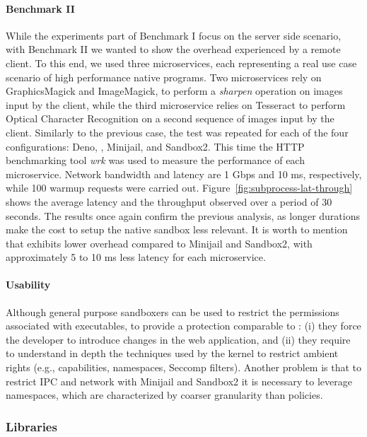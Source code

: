 \paragraph{Benchmark II}
%
While the experiments part of Benchmark I focus on the server side
scenario, with Benchmark II we wanted to show the overhead experienced
by a remote client. To this end, we used three microservices,
each representing a real use case scenario of high performance native
programs. Two microservices rely on GraphicsMagick and ImageMagick, to
perform a {\em sharpen} operation on images input by the client, while
the third microservice relies on Tesseract to perform Optical
Character Recognition on a second sequence of images input by the
client. Similarly to the previous case, the test was repeated for each
of the four configurations: Deno, \natisand, Minijail, and Sandbox2. This
time the HTTP benchmarking tool {\em wrk} was used to measure the
performance of each microservice.  Network bandwidth and latency are 1
Gbps and 10 ms, respectively, while 100 warmup requests were carried
out. Figure~\ref{fig:subprocess-lat-through} shows the average latency
and the throughput observed over a period of 30 seconds. The results
once again confirm the previous analysis, as longer durations make the
cost to setup the native sandbox less relevant. It is worth to mention
that \natisand exhibits lower overhead compared to Minijail and Sandbox2,
with approximately 5 to 10 ms less latency for each microservice.


\paragraph{Usability}
%
Although general purpose sandboxers can be used to restrict the
permissions associated with executables, to provide a protection
comparable to \natisand: (i) they force the developer to introduce changes in
the web application, and (ii) they require to understand in depth the
techniques used by the kernel to restrict ambient rights (e.g.,
capabilities, namespaces, Seccomp filters). Another problem is that to
restrict IPC and network with Minijail and Sandbox2 it is necessary to
leverage namespaces, which are characterized by coarser granularity
than \natisand policies.



\subsubsection{Libraries}

